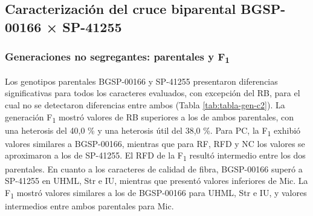 \documentclass[12pt,oneside]{reedthesis}
\begin{document}
\subsection{Caracterización del cruce biparental BGSP-00166 × SP-41255}\label{caracterizaciuxf3n-del-cruce-biparental-bgsp-00166-sp-41255}

\subsubsection{\texorpdfstring{Generaciones no segregantes: parentales y F\textsubscript{1}}{Generaciones no segregantes: parentales y F1}}\label{generaciones-no-segregantes-parentales-y-f1}

Los genotipos parentales BGSP-00166 y SP-41255 presentaron diferencias significativas para todos los caracteres evaluados, con excepción del RB, para el cual no se detectaron diferencias entre ambos (Tabla \ref{tab:tabla-gen-c2}). La generación F\textsubscript{1} mostró valores de RB superiores a los de ambos parentales, con una heterosis del 40,0 \% y una heterosis útil del 38,0 \%. Para PC, la F\textsubscript{1} exhibió valores similares a BGSP-00166, mientras que para RF, RFD y NC los valores se aproximaron a los de SP-41255. El RFD de la F\textsubscript{1} resultó intermedio entre los dos parentales. En cuanto a los caracteres de calidad de fibra, BGSP-00166 superó a SP-41255 en UHML, Str e IU, mientras que presentó valores inferiores de Mic. La F\textsubscript{1} mostró valores similares a los de BGSP-00166 para UHML, Str e IU, y valores intermedios entre ambos parentales para Mic.
\end{document}

